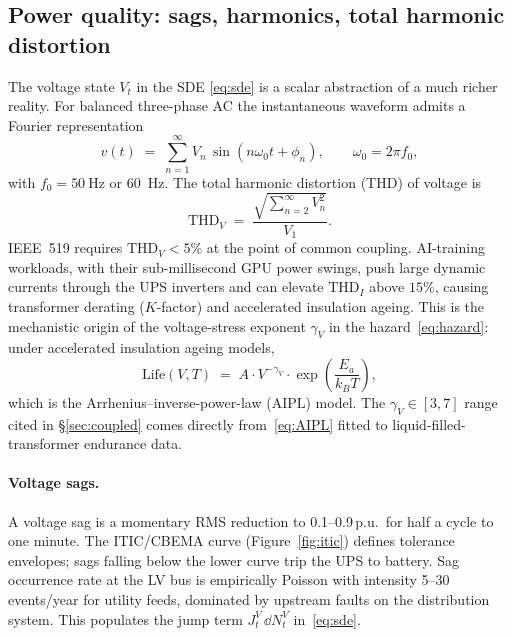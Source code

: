 \subsection{Power quality: sags, harmonics, total harmonic distortion}\label{ss:pq}

The voltage state $V_t$ in the SDE \eqref{eq:sde} is a scalar
abstraction of a much richer reality. For balanced three-phase AC
the instantaneous waveform admits a Fourier representation
\begin{equation}\label{eq:fourier}
   v(t) \;=\; \sum_{n=1}^{\infty} V_n\,\sin(n\omega_0 t + \phi_n),
   \qquad \omega_0 = 2\pi f_0,
\end{equation}
with $f_0=\SI{50}{\hertz}$ or \SI{60}{\hertz}. The total harmonic
distortion (THD) of voltage is
\begin{equation}\label{eq:THD}
   \mathrm{THD}_V \;=\;
   \frac{\sqrt{\sum_{n=2}^{\infty} V_n^2}}{V_1}.
\end{equation}
IEEE~519 requires $\mathrm{THD}_V<5\%$ at the point of common
coupling. AI-training workloads, with their sub-millisecond GPU power
swings, push large dynamic currents through the UPS inverters and can
elevate $\mathrm{THD}_I$ above $15\%$, causing transformer derating
($K$-factor) and accelerated insulation ageing. This is the
mechanistic origin of the voltage-stress exponent $\gamma_V$ in the
hazard~\eqref{eq:hazard}: under accelerated insulation ageing models,
\begin{equation}\label{eq:AIPL}
   \mathrm{Life}(V,T) \;=\;
   A\cdot V^{-\gamma_V}\cdot\exp\!\left(\frac{E_a}{k_B T}\right),
\end{equation}
which is the Arrhenius--inverse-power-law (AIPL) model. The
$\gamma_V\in[3,7]$ range cited in \S\ref{sec:coupled} comes
directly from~\eqref{eq:AIPL} fitted to liquid-filled-transformer
endurance data.

\paragraph{Voltage sags.} A voltage sag is a momentary RMS reduction
to \mbox{0.1--0.9}\,p.u.\ for half a cycle to one minute. The
ITIC/CBEMA curve (Figure~\ref{fig:itic}) defines tolerance envelopes;
sags falling below the lower curve trip the UPS to battery. Sag
occurrence rate at the LV bus is empirically Poisson with intensity
5--30 events/year for utility feeds, dominated by upstream faults on
the distribution system. This populates the jump term
$J^V_t\,\dd N^V_t$ in~\eqref{eq:sde}.

